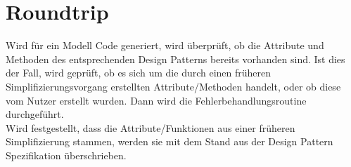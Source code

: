\section{Roundtrip}

Wird für ein Modell Code generiert, wird überprüft, ob die Attribute und Methoden des entsprechenden Design Patterns bereits vorhanden sind. Ist dies der Fall, wird geprüft, ob es sich um die durch einen früheren Simplifizierungsvorgang erstellten Attribute/Methoden handelt, oder ob diese vom Nutzer erstellt wurden. Dann wird die Fehlerbehandlungsroutine durchgeführt. \\
Wird festgestellt, dass die Attribute/Funktionen aus einer früheren Simplifizierung stammen, werden sie mit dem Stand aus der Design Pattern Spezifikation überschrieben.
